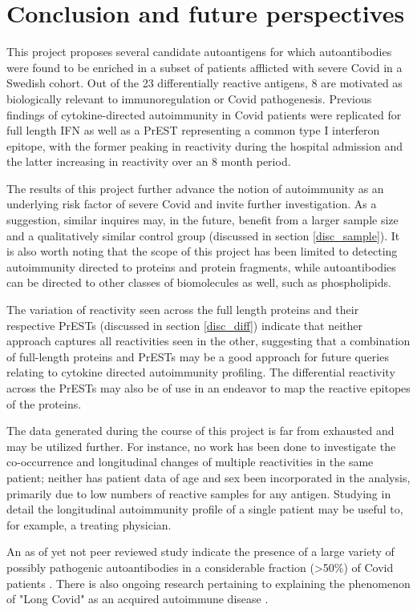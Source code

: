 \documentclass{article}
\begin{document}
\newpage
\section{Conclusion and future perspectives}
This project proposes several candidate autoantigens for which autoantibodies were found to be enriched in a subset of patients afflicted with severe Covid in a Swedish cohort. Out of the 23 differentially reactive antigens, 8 are motivated as biologically relevant to immunoregulation or Covid pathogenesis. Previous findings of cytokine-directed autoimmunity in Covid patients \cite{bastard} were replicated for full length IFN\textomega{} as well as a PrEST representing a common type I interferon epitope, with the former peaking in reactivity during the hospital admission and the latter increasing in reactivity over an 8 month period.

The results of this project further advance the notion of autoimmunity as an underlying risk factor of severe Covid and invite further investigation. As a suggestion, similar inquires may, in the future, benefit from a larger sample size and a qualitatively similar control group (discussed in section \ref{disc_sample}).  It is also worth noting that the scope of this project has been limited to detecting autoimmunity directed to proteins and protein fragments, while autoantibodies can be directed to other classes of biomolecules as well, such as phospholipids.

The variation of reactivity seen across the full length proteins and their respective PrESTs (discussed in section \ref{disc_diff}) indicate that neither approach captures all reactivities seen in the other, suggesting that a combination of full-length proteins and PrESTs may be a good approach for future queries relating to cytokine directed autoimmunity profiling. The differential reactivity across the PrESTs may also be of use in an endeavor to map the reactive epitopes of the proteins.

The data generated during the course of this project is far from exhausted and may be utilized further. For instance, no work has been done to investigate the co-occurrence and longitudinal changes of multiple reactivities in the same patient; neither has patient data of age and sex been incorporated in the analysis, primarily due to low numbers of reactive samples for any antigen. Studying in detail the longitudinal autoimmunity profile of a single patient may be useful to, for example, a treating physician. 

An as of yet not peer reviewed study indicate the presence of a large variety of possibly pathogenic autoantibodies in a considerable fraction (>50\%) of Covid patients \cite{new_aa_covid}. There is also ongoing research pertaining to explaining the phenomenon of "Long Covid" as an acquired autoimmune disease \cite{long_covid,aa_driving_severe_covid}.
\end{document}
